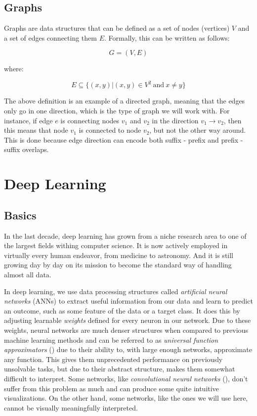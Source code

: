 \documentclass[times, utf8, diplomski, english]{fer_eng}
\begin{document}
\subsection{Graphs}

Graphs are data structures that can be defined as a set of nodes (vertices) $V$ and a set of edges connecting them $E$. Formally, this can be written as follows:

\[ G = (V, E) \]

where:

\[ E \subseteq 	\{ (x, y)|(x, y) \in V^2 \mathrm{\ and\ } x \neq y \} \]

The above definition is an example of a directed graph, meaning that the edges only go in one direction, which is the type of graph we will work with. For instance, if edge $e$ is connecting nodes $v_1$ and $v_2$ in the direction $v_1 \rightarrow v_2$, then this means that node $v_1$ is connected to node $v_2$, but not the other way around. This is done because edge direction can encode both suffix - prefix and prefix - suffix overlaps.

\section{Deep Learning}

\subsection{Basics}

In the last decade, deep learning has grown from a niche research area to one of the largest fields withing computer science. It is now actively employed in virtually every human endeavor, from medicine to astronomy. And it is still growing day by day on its mission to become the standard way of handling almost all data.

In deep learning, we use data processing structures called \textit{artificial neural networks} (ANNs) to extract useful information from our data and learn to predict an outcome, such as some feature of the data or a target class. It does this by adjusting learnable \textit{weights} defined for every neuron in our network. Due to these weights, neural networks are much denser structures when compared to previous machine learning methods and can be referred to as \textit{universal function approximators} (\cite{uni_approx}) due to their ability to, with large enough networks, approximate any function. This gives them unprecedented performance on previously unsolvable tasks, but due to their abstract structure, makes them somewhat difficult to interpret. Some networks, like \textit{convolutional neural networks} (\cite{CNN}), don't suffer from this problem as much and can produce some quite intuitive visualizations. On the other hand, some networks, like the ones we will use here, cannot be visually meaningfully interpreted.
\end{document}

